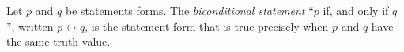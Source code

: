 \guard



\begin{defn}
\label{defn:biconditional}
  Let $p$ and $q$ be statements forms.
  The \emph{biconditional statement} ``$p$ if, and only if $q$'', written $p \leftrightarrow q$, is the statement form that is true precisely when $p$ and $q$ have the same truth value.
\end{defn}
